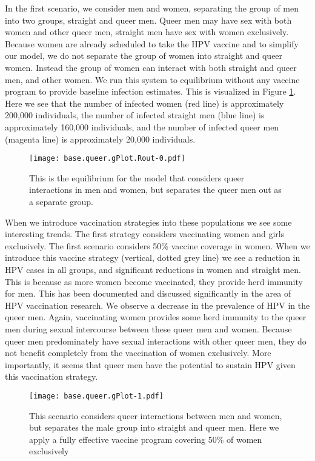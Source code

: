 \documentclass[12pt]{article}
\begin{document}
In the first scenario, we consider men and women, separating the group of men into two groups, straight and queer men.  Queer men may have sex with both women and other queer men, straight men have sex with women exclusively.  Because women are already scheduled to take the HPV vaccine and to simplify our model, we do not separate the group of women into straight and queer women. Instead the group of women can interact with both straight and queer men, and other women. We run this system to equilibrium without any vaccine program to provide baseline infection estimates.  This is visualized in Figure \ref{fig:QueerNoVacc}.  Here we see that the number of infected women (red line) is approximately 200,000 individuals, the number of infected straight men (blue line) is approximately 160,000 individuals, and the number of infected queer men (magenta line) is approximately 20,000 individuals.  

\begin{figure}[h!]
\begin{center}
\texttt{[image: base.queer.gPlot.Rout-0.pdf]}
\caption{This is the equilibrium for the model that considers queer interactions in men and women, but separates the queer men out as a separate group.}
\label{fig:QueerNoVacc}
\end{center}
\end{figure}

When we introduce vaccination strategies into these populations we see some interesting trends.  The first strategy considers vaccinating women and girls exclusively.  The first scenario considers 50\% vaccine coverage in women.  When we introduce this vaccine strategy (vertical, dotted grey line) we see a reduction in HPV cases in all groups, and significant reductions in women and straight men.  This is because as more women become vaccinated, they provide herd immunity for men.  This has been documented and discussed significantly in the area of HPV vaccination research.  We observe a decrease in the prevalence of HPV in the queer men.  Again, vaccinating women provides some herd immunity to the queer men during sexual intercourse between these queer men and women.  Because queer men predominately have sexual interactions with other queer men, they do not benefit completely from the vaccination of women exclusively.  More importantly, it seems that queer men have the potential to sustain HPV given this vaccination strategy.

\begin{figure}
\texttt{[image: base.queer.gPlot-1.pdf]}
\caption{This scenario considers queer interactions between men and women, but separates the male group into straight and queer men.  Here we apply a fully effective vaccine program covering 50\% of women exclusively}
\end{figure}
\end{document}
